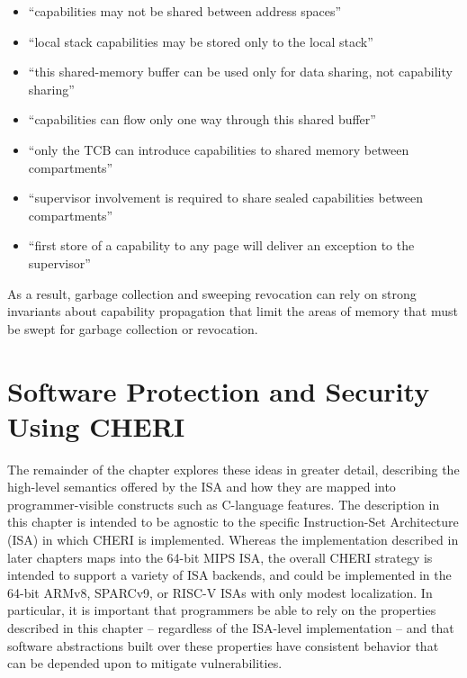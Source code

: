 \begin{itemize}
\item ``capabilities may not be shared between address spaces''
\item ``local stack capabilities may be stored only to the local stack''
\item ``this shared-memory buffer can be used only for data sharing, not
  capability sharing''
\item ``capabilities can flow only one way through this shared buffer''
\item ``only the TCB can introduce capabilities to shared memory between
  compartments''
\item ``supervisor involvement is required to share sealed capabilities
  between compartments''
\item ``first store of a capability to any page will deliver an exception to
  the supervisor''
\end{itemize}

\noindent
As a result, garbage collection and sweeping revocation can rely on strong
invariants about capability propagation that limit the areas of memory that
must be swept for garbage collection or revocation.

\section{Software Protection and Security Using CHERI}
\label{sec:software-protection-using-cheri}

The remainder of the chapter explores these ideas in greater detail,
describing the high-level semantics
 offered
by the ISA and how they are mapped
into programmer-visible constructs such as C-language features.
The description in this chapter is intended to be agnostic to the specific
Instruction-Set Architecture (ISA) in which CHERI is implemented.  
Whereas the
implementation described in later chapters maps into the 64-bit MIPS ISA, the
overall CHERI strategy is intended to support a variety of ISA backends, and
could be implemented in the 64-bit ARMv8, SPARCv9, or RISC-V ISAs with only
modest localization.
In particular, it is important that programmers be able to rely on the
properties described in this chapter -- regardless of the ISA-level
implementation -- 
and that software abstractions built over these properties have 
consistent behavior that can be depended upon to mitigate vulnerabilities.

